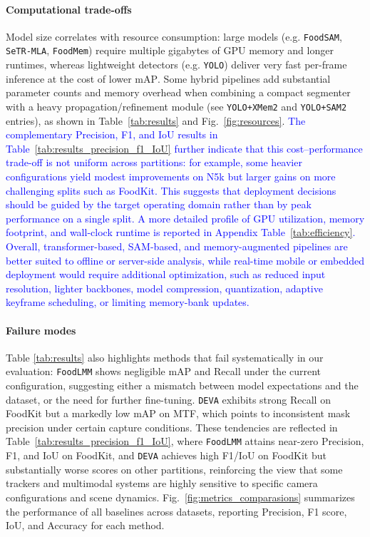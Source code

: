 \documentclass[preprint,12pt]{elsarticle}
\newcommand{\change}[1]{\textcolor{blue}{#1}}
\begin{document}
\paragraph{Computational trade-offs} Model size correlates with resource consumption: large models (e.g. \texttt{FoodSAM}, \texttt{SeTR-MLA}, \texttt{FoodMem}) require multiple gigabytes of GPU memory and longer runtimes, whereas lightweight detectors (e.g. \texttt{YOLO}) deliver very fast per-frame inference at the cost of lower $\mathrm{mAP}$. Some hybrid pipelines add substantial parameter counts and memory overhead when combining a compact segmenter with a heavy propagation/refinement module (see \texttt{YOLO+XMem2} and \texttt{YOLO+SAM2} entries), as shown in Table~\ref{tab:results} and Fig.~\ref{fig:resources}. \change{The complementary Precision, F1, and IoU results in Table~\ref{tab:results_precision_f1_IoU} further indicate that this cost--performance trade-off is not uniform across partitions: for example, some heavier configurations yield modest improvements on N5k but larger gains on more challenging splits such as FoodKit. This suggests that deployment decisions should be guided by the target operating domain rather than by peak performance on a single split. A more detailed profile of GPU utilization, memory footprint, and wall-clock runtime is reported in Appendix Table~\ref{tab:efficiency}. Overall, transformer-based, SAM-based, and memory-augmented pipelines are better suited to offline or server-side analysis, while real-time mobile or embedded deployment would require additional optimization, such as reduced input resolution, lighter backbones, model compression, quantization, adaptive keyframe scheduling, or limiting memory-bank updates.}

\paragraph{Failure modes} Table \ref{tab:results} also highlights methods that fail systematically in our evaluation: \texttt{FoodLMM} shows negligible $\mathrm{mAP}$ and Recall under the current configuration, suggesting either a mismatch between model expectations and the dataset, or the need for further fine-tuning. \texttt{DEVA} exhibits strong Recall on FoodKit but a markedly low $\mathrm{mAP}$ on MTF, which points to inconsistent mask precision under certain capture conditions.
These tendencies are reflected in Table~\ref{tab:results_precision_f1_IoU}, where \texttt{FoodLMM} attains near-zero Precision, F1, and IoU on FoodKit, and \texttt{DEVA} achieves high F1/IoU on FoodKit but substantially worse scores on other partitions, reinforcing the view that some trackers and multimodal systems are highly sensitive to specific camera configurations and scene dynamics. Fig.~\ref{fig:metrics_comparasions} summarizes the performance of all baselines across datasets, reporting Precision, F1 score, IoU, and Accuracy for each method.
\end{document}
